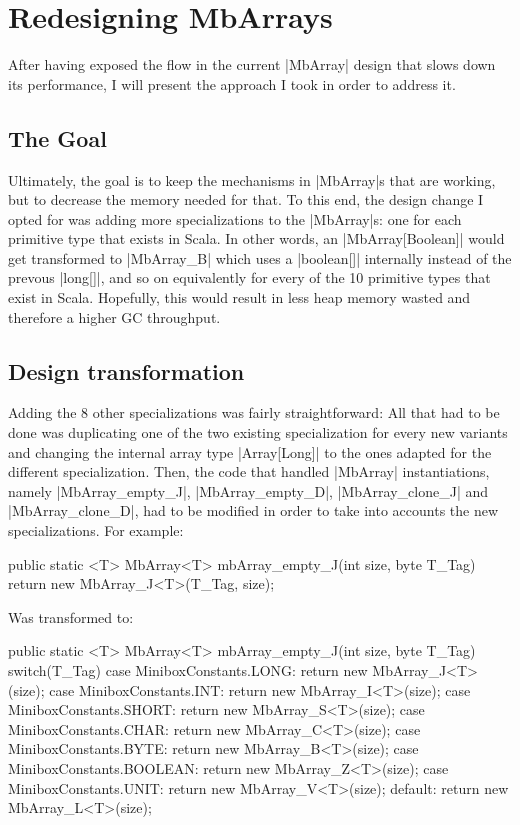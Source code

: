 \section{Redesigning MbArrays}
\label{sec:redesign}

After having exposed the flow in the current |MbArray| design that slows down its performance, I will present the approach I took in order to address it.

\subsection{The Goal}

Ultimately, the goal is to keep the mechanisms in |MbArray|s that are working, but to decrease the memory needed for that.
To this end, the design change I opted for was adding more specializations to the |MbArray|s: one for each primitive type that exists in Scala. In other words, an |MbArray[Boolean]| would get transformed to |MbArray_B| which uses a |boolean[]| internally instead of the prevous |long[]|, and so on equivalently for every of the 10 primitive types that exist in Scala. Hopefully, this would result in less heap memory wasted and therefore a higher GC throughput.

\subsection{Design transformation}

Adding the 8 other specializations was fairly straightforward: All that had to be done was duplicating one of the two existing specialization for every new variants and changing the internal array type |Array[Long]| to the ones adapted for the different specialization.
Then, the code that handled |MbArray| instantiations, namely |MbArray_empty_J|, |MbArray_empty_D|, |MbArray_clone_J| and |MbArray_clone_D|, had to be modified in order to take into accounts the new specializations.
For example:

\begin{lstlisting-nobreak-java}
public static <T> MbArray<T> mbArray_empty_J(int size, byte T_Tag) {
  return new MbArray_J<T>(T_Tag, size);
}
\end{lstlisting-nobreak-java}

Was transformed to:

\begin{lstlisting-nobreak-java}
public static <T> MbArray<T> mbArray_empty_J(int size, byte T_Tag) {
  switch(T_Tag) {
  case MiniboxConstants.LONG:
    return new MbArray_J<T>(size);
  case MiniboxConstants.INT:
    return new MbArray_I<T>(size);
  case MiniboxConstants.SHORT:
    return new MbArray_S<T>(size);
  case MiniboxConstants.CHAR:
    return new MbArray_C<T>(size);
  case MiniboxConstants.BYTE:
    return new MbArray_B<T>(size);
  case MiniboxConstants.BOOLEAN:
    return new MbArray_Z<T>(size);
  case MiniboxConstants.UNIT:
    return new MbArray_V<T>(size);
  default:
    return new MbArray_L<T>(size);
  }
}
\end{lstlisting-nobreak-java}

